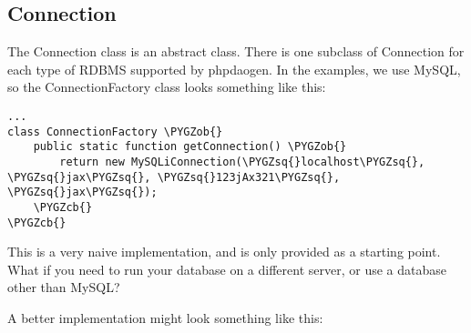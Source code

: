 \documentclass[letterpaper,10pt,english]{sphinxmanual}
\def\PYGZob{\char`\{}
\def\PYGZcb{\char`\}}
\def\PYGZsq{\char`\'}
\renewcommand\PYGZsq{\textquotesingle}
\begin{document}
\subsection{Connection}
\label{jaxFrameworkGuide:connection}
The Connection class is an abstract class.  There is one subclass of Connection for each type of
RDBMS supported by phpdaogen.  In the examples, we use MySQL, so the ConnectionFactory class looks
something like this:

\begin{Verbatim}[commandchars=\\\{\}]
...
class ConnectionFactory \PYGZob{}
    public static function getConnection() \PYGZob{}
        return new MySQLiConnection(\PYGZsq{}localhost\PYGZsq{}, \PYGZsq{}jax\PYGZsq{}, \PYGZsq{}123jAx321\PYGZsq{}, \PYGZsq{}jax\PYGZsq{});
    \PYGZcb{}
\PYGZcb{}
\end{Verbatim}

This is a very naive implementation, and is only provided as a starting point.  What if you need to
run your database on a different server, or use a database other than MySQL?

A better implementation might look something like this:
\end{document}
